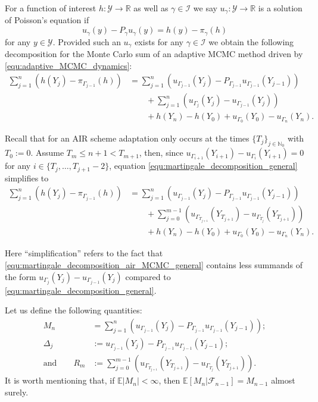 \documentclass[12pt]{article}
\theoremstyle{definition}
\newcommand{\N}{\mathbb{N}}
\newcommand{\E}{\mathbb{E}}
\newcommand{\R}{\mathbb{R}}
\newcommand{\cY}{\mathcal{Y}}
\begin{document}
For a function of interest $h \colon \cY \to \R$ as well as $\gamma \in \mathcal{I}$ we say $u_\gamma\colon \cY \to \R$ is a solution of Poisson's equation if
\[
u_\gamma (y) -P_\gamma u_\gamma(y) 
= 
h(y) - {\pi}_\gamma(h)
\]
for any $y \in \cY$.
Provided such an $u_\gamma$ exists for any $\gamma \in \mathcal{I}$ we obtain the following decomposition for the Monte Carlo sum of an adaptive MCMC method driven by \eqref{equ:adaptive_MCMC_dynamics}:
\begin{align}\label{equ:martingale_decomposition_general}
	\sum_{j=1}^n \left( h(Y_j)- {\pi}_{\Gamma_{j-1}}(h) \right) 
	&= 
	\sum_{j=1}^n \left( {u}_{\Gamma_{j-1}}(Y_j)- {P}_{\Gamma_{j-1}}{u}_{\Gamma_{j-1}}(Y_{j-1}) \right)\nonumber \\
	&\qquad+ \sum_{j=1}^n \left( {u}_{\Gamma_{j}}(Y_j)- {u}_{\Gamma_{j-1}}(Y_{j}) \right) \nonumber\\
	&\qquad+h(Y_n) - h(Y_0) 
	+{u}_{\Gamma_0}(Y_0) - {u}_{\Gamma_{n}}(Y_n).
\end{align}

Recall that for an AIR scheme adaptation only occurs at the times $\{T_j\}_{j \in \N_0}$ with $T_0 := 0$. 
Assume $T_m \leq n+1 < T_{m+1}$,
then, since $u_{\Gamma_{i+1}}(Y_{i+1}) - u_{\Gamma_{i}}(Y_{i+1}) =0$ for any $i \in \{T_{j}, \dots, T_{j+1}-2\}$, equation \eqref{equ:martingale_decomposition_general} simplifies to 
\begin{align}\label{equ:martingale_decomposition_air_MCMC_general}
	\sum_{j=1}^n \left( h(Y_j)- {\pi}_{\Gamma_{j-1}}(h) \right) 
	&=
	\sum_{j=1}^n \left( {u}_{\Gamma_{j-1}}(Y_j)- {P}_{\Gamma_{j-1}}{u}_{\Gamma_{j-1}}(Y_{j-1}) \right)\nonumber \\
	&\qquad+ \sum_{j=0}^{m-1} \left( u_{\Gamma_{T_{j+1}}}(Y_{T_{j+1}}) - u_{\Gamma_{T_j}}(Y_{T_{j+1}}) \right)  \nonumber\\
	&\qquad+h(Y_n) - h(Y_0) 
	+{u}_{\Gamma_0}(Y_0) - {u}_{\Gamma_{n}}(Y_n).
\end{align}

Here ``simplification'' refers to the fact that \eqref{equ:martingale_decomposition_air_MCMC_general} contains less summands of the form ${u}_{\Gamma_{j}}(Y_j)- {u}_{\Gamma_{j-1}}(Y_{j})$ compared to \eqref{equ:martingale_decomposition_general}.

Let us define the following quantities:
\begin{align*}
	M_n &= \sum_{j=1}^n \left( {u}_{\Gamma_{j-1}}(Y_j)- {P}_{\Gamma_{j-1}}{u}_{\Gamma_{j-1}}(Y_{j-1}) \right); \\
	\Delta_j &:= {u}_{\Gamma_{j-1}}(Y_j)- {P}_{\Gamma_{j-1}}{u}_{\Gamma_{j-1}}(Y_{j-1}); \\
	\text{and} \qquad R_m &:= \sum_{j=0}^{m-1} \left( u_{\Gamma_{T_{j+1}}}(Y_{T_{j+1}}) - u_{\Gamma_{T_j}}(Y_{T_{j+1}}) \right).
\end{align*} 
It is worth mentioning that, if $\E\vert M_n \vert <\infty$, then
	$\E [M_n\vert \mathcal{F}_{n-1}] = M_{n-1}$ almost surely.
\end{document}
